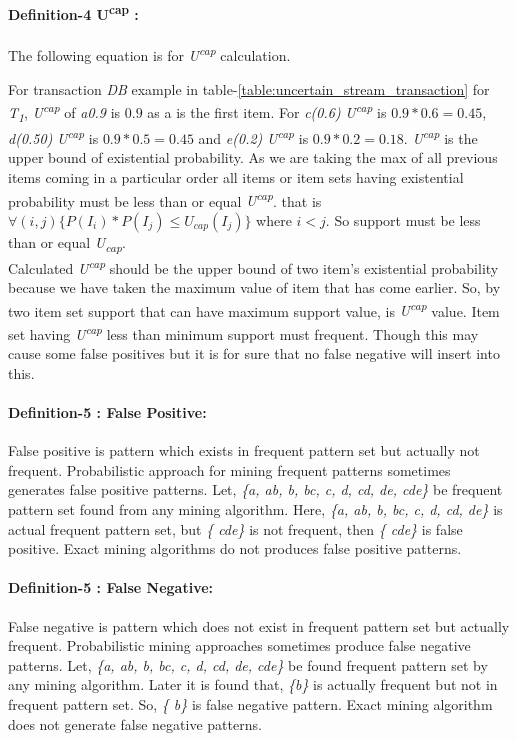     \paragraph{Definition-4 U\textsuperscript{cap} :}
    The following equation is for \emph{U\textsuperscript{cap}}    calculation.
    
    For transaction \emph{DB} example in table-\ref{table:uncertain_stream_transaction} for \emph{T\textsubscript{1}}, \emph{U\textsuperscript{cap}} of \emph{a{0.9}} is $0.9$ as a is the first item. For \emph{c(0.6)} \emph{U\textsuperscript{cap}} is $0.9*0.6=0.45$, \emph{d(0.50)} \emph{U\textsuperscript{cap}} is $0.9*0.5=0.45$ and \emph{e(0.2)} \emph{U\textsuperscript{cap}} is $0.9*0.2=0.18$. \emph{U\textsuperscript{cap}} is the upper bound of existential probability. As we are taking the max of all previous items coming in a particular order all items or item sets having existential probability must be less than or equal \emph{U\textsuperscript{cap}}. that is $\forall(i,j)\{ P(I_i)*P(I_j)\leq U_{cap}(I_j)\}$ where $i < j$. So support must be less than or equal \emph{U\textsubscript{cap}}.\\
    Calculated \emph{U\textsuperscript{cap}} should be the upper bound of two item's existential probability because we have taken the maximum value of item that has come earlier. So, by two item set support that can have maximum support value, is \emph{U\textsuperscript{cap}} value. Item set having \emph{U\textsuperscript{cap}} less than minimum support must frequent. Though this may cause some false positives but it is for sure that no false negative will insert into this. 
    
	
    \paragraph{Definition-5 : False Positive: } False positive is pattern which exists in frequent pattern set but actually not frequent. Probabilistic approach for mining frequent patterns sometimes generates false positive patterns. Let, \emph{\{a, ab, b, bc, c, d, cd, de, cde\}} be frequent pattern set found from any mining algorithm. Here, \emph{\{a, ab, b, bc, c, d, cd, de\}} is actual frequent pattern set, but \emph{\{ cde\}} is not frequent, then \emph{\{ cde\}} is false positive. Exact mining algorithms do not produces false positive patterns.
    
	\paragraph{Definition-5 : False Negative: } False negative is pattern which does not exist in frequent pattern set but actually frequent. Probabilistic mining approaches sometimes produce false negative patterns. Let, \emph{\{a, ab, b, bc, c, d, cd, de, cde\}} be found frequent pattern set by any mining algorithm. Later it is found that, \emph{\{b\}} is actually frequent but not in frequent pattern set. So, \emph{\{ b\}} is false negative pattern. Exact mining algorithm does not generate false negative patterns.
	

